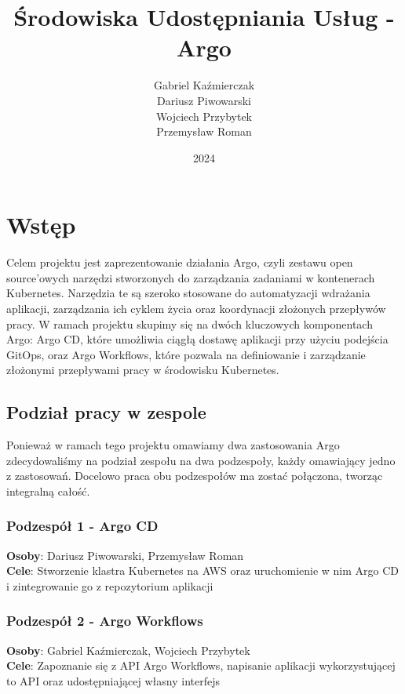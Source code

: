\documentclass{article}
\title{\textbf{Środowiska Udostępniania Usług - Argo}}
\author{Gabriel Kaźmierczak\\ Dariusz Piwowarski\\ Wojciech Przybytek\\ Przemysław Roman}
\date{2024}
\begin{document}
\begin{titlingpage}
\maketitle
\end{titlingpage}


\newpage
\tableofcontents


\newpage
\section{Wstęp}
Celem projektu jest zaprezentowanie działania Argo, czyli zestawu open source'owych narzędzi stworzonych do zarządzania zadaniami w kontenerach Kubernetes. Narzędzia te są szeroko stosowane do automatyzacji wdrażania aplikacji, zarządzania ich cyklem życia oraz koordynacji złożonych przepływów pracy. W ramach projektu skupimy się na dwóch kluczowych komponentach Argo: Argo CD, które umożliwia ciągłą dostawę aplikacji przy użyciu podejścia GitOps, oraz Argo Workflows, które pozwala na definiowanie i zarządzanie złożonymi przepływami pracy w środowisku Kubernetes.

\subsection*{Podział pracy w zespole}
Ponieważ w ramach tego projektu omawiamy dwa zastosowania Argo zdecydowaliśmy na podział zespołu na dwa podzespoły, każdy omawiający jedno z zastosowań.
Docelowo praca obu podzespołów ma zostać połączona, tworząc integralną całość.

\subsubsection*{Podzespół 1 - Argo CD}
\textbf{Osoby}: Dariusz Piwowarski, Przemysław Roman \\
\textbf{Cele}: Stworzenie klastra Kubernetes na AWS oraz uruchomienie w nim Argo CD i zintegrowanie go z repozytorium aplikacji

\subsubsection*{Podzespół 2 - Argo Workflows}
\textbf{Osoby}: Gabriel Kaźmierczak, Wojciech Przybytek \\
\textbf{Cele}: Zapoznanie się z API Argo Workflows, napisanie aplikacji wykorzystującej to API oraz udostępniającej własny interfejs
\end{document}
